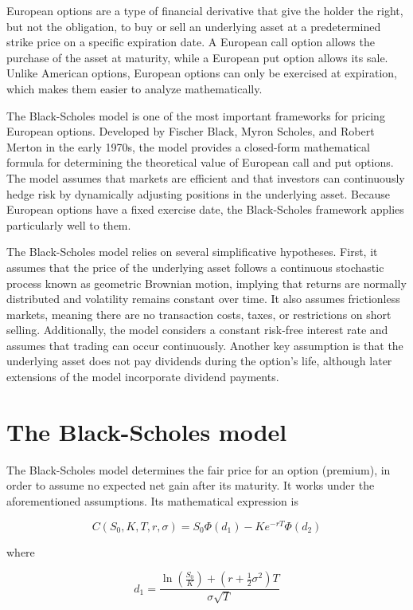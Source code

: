 \documentclass[11pt,oneside,parskip=half]{scrbook}  %
\begin{document}
European options are a type of financial derivative that give the holder the right, but not the obligation, to buy or sell an underlying asset at a predetermined strike price on a specific expiration date. A European call option allows the purchase of the asset at maturity, while a European put option allows its sale. Unlike American options, European options can only be exercised at expiration, which makes them easier to analyze mathematically.

The Black-Scholes model is one of the most important frameworks for pricing European options. Developed by Fischer Black, Myron Scholes, and Robert Merton in the early 1970s, the model provides a closed-form mathematical formula for determining the theoretical value of European call and put options. The model assumes that markets are efficient and that investors can continuously hedge risk by dynamically adjusting positions in the underlying asset. Because European options have a fixed exercise date, the Black-Scholes framework applies particularly well to them.

The Black-Scholes model relies on several simplificative hypotheses. First, it assumes that the price of the underlying asset follows a continuous stochastic process known as geometric Brownian motion, implying that returns are normally distributed and volatility remains constant over time. It also assumes frictionless markets, meaning there are no transaction costs, taxes, or restrictions on short selling. Additionally, the model considers a constant risk-free interest rate and assumes that trading can occur continuously. Another key assumption is that the underlying asset does not pay dividends during the option's life, although later extensions of the model incorporate dividend payments.

\section{The Black-Scholes model}

The Black-Scholes model determines the fair price for an option (premium), in order to assume no expected net gain after its maturity. It works under the aforementioned assumptions. Its mathematical expression is

$$
C(S_0, K, T, r, \sigma) = S_0 \Phi(d_1) - K e^{-rT} \Phi(d_2)
$$

where

$$
d_1 = \frac{ \ln\left(\frac{S_0}{K}\right) + \left(r + \frac{1}{2}\sigma^2\right)T }{ \sigma \sqrt{T} }
$$
\end{document}
